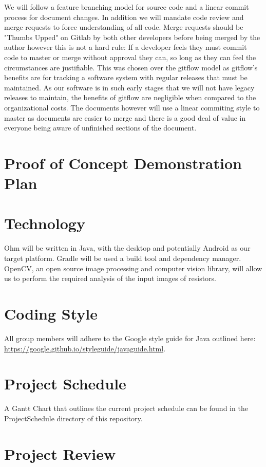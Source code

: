 \documentclass{article}
\begin{document}
We will follow a feature branching model for source code and a linear commit process for document changes.
In addition we will mandate code review and merge requests to force understanding of all code.
Merge requests should be "Thumbs Upped" on Gitlab by both other developers before being merged by the author however this is not a hard rule:
If a developer feels they must commit code to master or merge without approval they can, so long as they can feel the circumstances are justifiable.
This was chosen over the gitflow model as gitflow's benefits are for tracking a software system with regular releases that must be maintained.
As our software is in such early stages that we will not have legacy releases to maintain, the benefits of gitflow are negligible when compared to the organizational costs.
The documents however will use a linear commiting style to master as documents are easier to merge and there is a good deal of value in everyone being aware of unfinished sections of the document.

\section{Proof of Concept Demonstration Plan}

\section{Technology}
Ohm will be written in Java, with the desktop and potentially Android as our target platform. Gradle will be used a build tool and dependency manager. OpenCV, an open source image processing and computer vision library, will allow us to perform the required analysis of the input images of resistors.

\section{Coding Style}
All group members will adhere to the Google style guide for Java outlined here: \url{https://google.github.io/styleguide/javaguide.html}.


\section{Project Schedule}
A Gantt Chart that outlines the current project schedule can be found in the ProjectSchedule directory of this repository.

\section{Project Review}
\end{document}
